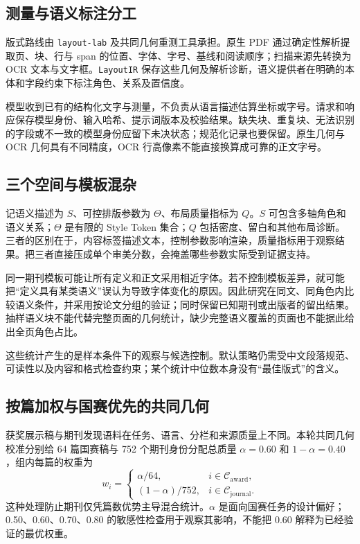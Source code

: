 \documentclass[UTF8,a4paper,zihao=-4,fontset=fandol]{ctexart}
\newcommand{\code}[1]{\texttt{\small #1}}
\begin{document}
\subsection{测量与语义标注分工}

版式路线由 \code{layout-lab} 及共同几何重测工具承担。原生 PDF 通过确定性解析提取页、块、行与 span 的位置、字体、字号、基线和阅读顺序；扫描来源先转换为 OCR 文本与文字框。\code{LayoutIR} 保存这些几何及解析诊断，语义提供者在明确的本体和字段约束下标注角色、关系及置信度\cite{architecture,layoutcal}。

模型收到已有的结构化文字与测量，不负责从语言描述估算坐标或字号。请求和响应保存模型身份、输入哈希、提示词版本及校验结果。缺失块、重复块、无法识别的字段或不一致的模型身份应留下未决状态；规范化记录也要保留。原生几何与 OCR 几何具有不同精度，OCR 行高像素不能直接换算成可靠的正文字号。

\subsection{三个空间与模板混杂}

记语义描述为 $S$、可控排版参数为 $\Theta$、布局质量指标为 $Q$。$S$ 可包含多轴角色和语义关系；$\Theta$ 是有限的 Style Token 集合；$Q$ 包括密度、留白和其他布局诊断。三者的区别在于，内容标签描述文本，控制参数影响渲染，质量指标用于观察结果。把三者直接压成单个审美分数，会掩盖哪些参数实际受到证据支持。

同一期刊模板可能让所有定义和正文采用相近字体。若不控制模板差异，就可能把“定义具有某类语义”误认为导致字体变化的原因。因此研究在同文、同角色内比较语义条件，并采用按论文分组的验证；同时保留已知期刊或出版者的留出结果。抽样语义块不能代替完整页面的几何统计，缺少完整语义覆盖的页面也不能据此给出全页角色占比。

这些统计产生的是样本条件下的观察与候选控制。默认策略仍需受中文段落规范、可读性以及内容和格式检查约束；某个统计中位数本身没有“最佳版式”的含义。

\subsection{按篇加权与国赛优先的共同几何}

获奖展示稿与期刊发现语料在任务、语言、分栏和来源质量上不同。本轮共同几何校准分别给 64 篇国赛稿与 752 个期刊身份分配总质量 $\alpha=0.60$ 和 $1-\alpha=0.40$，组内每篇的权重为
\begin{equation}
w_i=\begin{cases}\alpha/64,& i\in\mathcal C_{\mathrm{award}},\\
(1-\alpha)/752,&i\in\mathcal C_{\mathrm{journal}}.
\end{cases}
\label{eq:weights}
\end{equation}
这种处理防止期刊仅凭篇数优势主导混合统计。$\alpha$ 是面向国赛任务的设计偏好；0.50、0.60、0.70、0.80 的敏感性检查用于观察其影响，不能把 0.60 解释为已经验证的最优权重。
\end{document}
